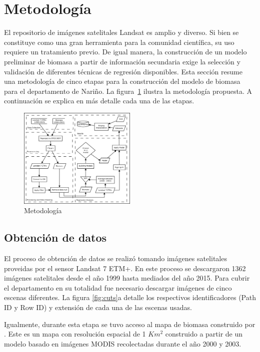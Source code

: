 
\section{Metodología}
El repositorio de imágenes satelitales Landsat es amplio y diverso.  Si bien se constituye como una gran herramienta para la comunidad científica, su uso requiere un tratamiento previo.  De igual manera, la construcción de un modelo preliminar de biomasa a partir de información secundaria exige la selección y validación de diferentes técnicas de regresión disponibles.  Esta sección resume una metodología de cinco etapas para la construcción del modelo de biomasa para el departamento de Nariño.  La figura~\ref{fig:metodology} ilustra la metodología propuesta. A continuación se explica en más detalle cada una de las etapas.

\begin{figure}
  \centering
  \includegraphics[width = 0.5\textwidth]{metodology.png}
  \caption{Metodología}
  \label{fig:metodology}
\end{figure}

\subsection{Obtención de datos}

El proceso de obtención de datos se realizó tomando imágenes satelitales proveidas por el sensor Landsat 7 ETM+. En este proceso se descargaron 1362 imágenes satelitales desde el año 1999 hasta mediados del año 2015. Para cubrir el departamento en su totalidad fue necesario descargar imágenes de cinco escenas diferentes.  La figura \ref{fig:cuts}a detalle los respectivos identificadores (Path ID y Row ID) y extensión de cada una de las escenas usadas.

Igualmente, durante esta etapa se tuvo acceso al mapa de biomasa construido por \cite{baccini2008afirst}.  Este es un mapa con resolución espacial de 1 $Km^2$ construido a partir de un modelo basado en imágenes MODIS recolectadas durante el año 2000 y 2003.

